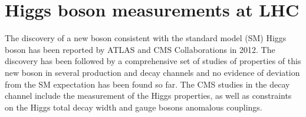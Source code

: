 \section{Higgs boson measurements at LHC}
\label{sec:HiggsBosonLHC}

The discovery of a new boson consistent with the standard model (SM) Higgs boson has
been reported by ATLAS and CMS Collaborations in 2012. The discovery has been followed
by a comprehensive set of studies of properties of this new boson in several production and
decay channels and no evidence of deviation from the SM expectation has been found so
far. The CMS studies in the \hwwllnn decay channel include the measurement
of the Higgs properties, as well as constraints on the Higgs total decay width and gauge
bosons anomalous couplings.
